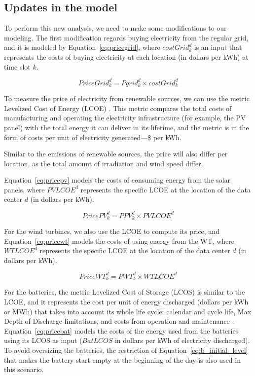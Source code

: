\subsection{Updates in the model}

To perform this new analysis, we need to make some modifications to our modeling. The first modification regards buying electricity from the regular grid, and it is modeled by Equation~\eqref{eq:pricegrid}, where $costGrid^d_k$ is an input that represents the costs of buying electricity at each location (in dollars per kWh) at time slot $k$.

\begin{equation} \label{eq:pricegrid}
 PriceGrid^d_k = Pgrid^d_k \times costGrid^d_k
\end{equation}

To measure the price of electricity from renewable sources, we can use the metric Levelized Cost of Energy (LCOE) \cite{nrel_economic_wt_1995}. This metric compares the total costs of manufacturing and operating the electricity infrastructure (for example, the PV panel) with the total energy it can deliver in its lifetime, and the metric is in the form of costs per unit of electricity generated---\$ per kWh.

Similar to the  emissions of renewable sources, the price will also differ per location, as the total amount of irradiation and wind speed differ.

Equation~\eqref{eq:pricepv} models the costs of consuming energy from the solar panels, where $PVLCOE^d$ represents the specific LCOE at the location of the data center $d$ (in dollars per kWh).

\begin{equation} \label{eq:pricepv}
  PricePV^d_k = PPV^d_k \times PVLCOE^d
\end{equation}


For the wind turbines, we also use the LCOE to compute its price, and Equation~\eqref{eq:pricewt} models the costs of using energy from the WT, where $WTLCOE^d$ represents the specific LCOE at the location of the data center $d$ (in dollars per kWh).

\begin{equation} \label{eq:pricewt}
  PriceWT^d_k = PWT^d_k \times WTLCOE^d
\end{equation}

For the batteries, the metric Levelized Cost of Storage (LCOS) is similar to the LCOE, and it represents the cost per unit of energy discharged (dollars per kWh or MWh) that takes into account its whole life cycle: calendar and cycle life, Max Depth of Discharge limitations, and costs from operation and maintenance \cite{battery_lcos_2022}.  Equation~\eqref{eq:pricebat} models the costs of the energy used from the batteries using its LCOS as input ($BatLCOS$ in dollars per kWh of electricity discharged). To avoid oversizing the batteries, the restriction of Equation~\eqref{eq:b_initial_level} that makes the battery start empty at the beginning of the day is also used in this scenario.

